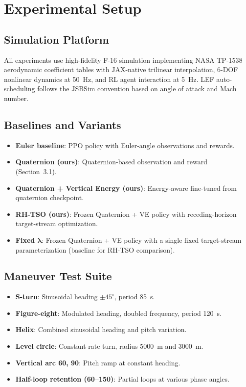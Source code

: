 \documentclass{article}
\begin{document}

\section{Experimental Setup}

\subsection{Simulation Platform}

All experiments use high-fidelity F-16 simulation implementing NASA TP-1538 aerodynamic coefficient tables with JAX-native trilinear interpolation, 6-DOF nonlinear dynamics at 50~Hz, and RL agent interaction at 5~Hz.
LEF auto-scheduling follows the JSBSim convention based on angle of attack and Mach number.

\subsection{Baselines and Variants}

\begin{itemize}
  \item \textbf{Euler baseline}: PPO policy with Euler-angle observations and rewards.
  \item \textbf{Quaternion (ours)}: Quaternion-based observation and reward (Section~3.1).
  \item \textbf{Quaternion + Vertical Energy (ours)}: Energy-aware fine-tuned from quaternion checkpoint.
  \item \textbf{RH-TSO (ours)}: Frozen Quaternion + VE policy with receding-horizon target-stream optimization.
  \item \textbf{Fixed $\bm{\lambda}$}: Frozen Quaternion + VE policy with a single fixed target-stream parameterization (baseline for RH-TSO comparison).
\end{itemize}

\subsection{Maneuver Test Suite}

\begin{itemize}
  \item \textbf{S-turn}: Sinusoidal heading $\pm45^\circ$, period 85~s.
  \item \textbf{Figure-eight}: Modulated heading, doubled frequency, period 120~s.
  \item \textbf{Helix}: Combined sinusoidal heading and pitch variation.
  \item \textbf{Level circle}: Constant-rate turn, radius 5000~m and 3000~m.
  \item \textbf{Vertical arc 60\textdegree, 90\textdegree}: Pitch ramp at constant heading.
  \item \textbf{Half-loop retention (60\textdegree--150\textdegree)}: Partial loops at various phase angles.
\end{itemize}
\end{document}
